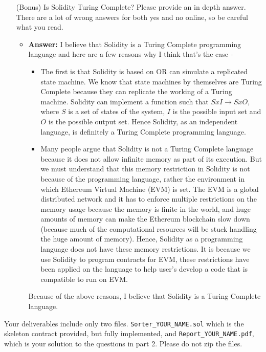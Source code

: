 \documentclass[11pt]{article}
\begin{document}
\begin{enumerate}
	\item[(Bonus)] Is Solidity Turing Complete? Please provide an in depth answer. There are a lot of wrong answers for both yes and no online, so be careful what you read. 
	\begin{itemize}
	    \item \textbf{Answer: } I believe that Solidity is a Turing Complete programming language and here are a few reasons why I think that's the case -
	    \begin{itemize}
	        \item The first is that Solidity is based on OR can simulate a replicated state machine. We know that state machines by themselves are Turing Complete because they can replicate the working of a Turing machine. Solidity can implement a function such that $S x I \rightarrow S x O$, where $S$ is a set of states of the system, $I$ is the possible input set and $O$ is the possible output set. Hence Solidity, as an independent language, is definitely a Turing Complete programming language.
	        \item Many people argue that Solidity is not a Turing Complete language because it does not allow infinite memory as part of its execution. But we must understand that this memory restriction in Solidity is not because of the programming language, rather the environment in which Ethereum Virtual Machine (EVM) is set. The EVM is a global distributed network and it has to enforce multiple restrictions on the memory usage because the memory is finite in the world, and huge amounts of memory can make the Ethereum blockchain slow down (because much of the computational resources will be stuck handling the huge amount of memory). Hence, Solidity as a programming language does not have these memory restrictions. It is because we use Solidity to program contracts for EVM, these restrictions have been applied on the language to help user's develop a code that is compatible to run on EVM.
	    \end{itemize}
	    Because of the above reasons, I believe that Solidity is a Turing Complete language.
	\end{itemize}

\end{enumerate}


Your deliverables include only two files. \texttt{Sorter\_YOUR\_NAME.sol} which is the skeleton contract provided, but fully implemented, and \texttt{Report\_YOUR\_NAME.pdf}, which is your solution to the questions in part 2. Please do not zip the files. 
\end{document}
